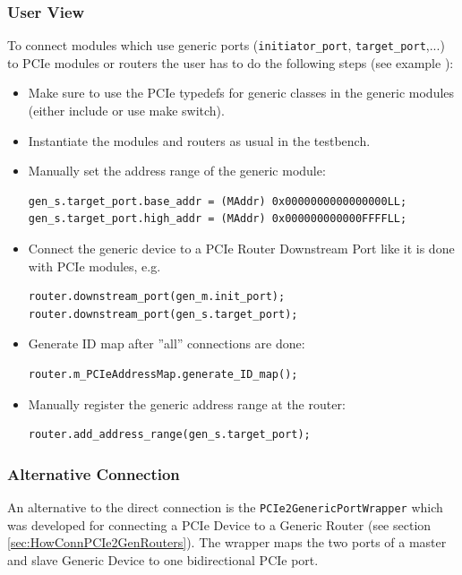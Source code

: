 \subsubsection{User View}
To connect modules which use generic ports (\lstinline|initiator_port|, \lstinline|target_port|,...) to PCIe modules or routers the user has to do the following steps (see example ):
\begin{itemize}
  \item Make sure to use the PCIe typedefs for generic classes in the generic modules (either include  or use make switch).
  \item Instantiate the modules and routers as usual in the testbench.
  \item Manually set the address range of the generic module:
    \begin{lstlisting}
gen_s.target_port.base_addr = (MAddr) 0x0000000000000000LL;
gen_s.target_port.high_addr = (MAddr) 0x000000000000FFFFLL;
    \end{lstlisting}
  \item Connect the generic device to a PCIe Router Downstream Port like it is done with PCIe modules, e.g. 
    \begin{lstlisting}
router.downstream_port(gen_m.init_port);
router.downstream_port(gen_s.target_port);
    \end{lstlisting}
  \item Generate ID map after ''all'' connections are done:
    \begin{lstlisting}
router.m_PCIeAddressMap.generate_ID_map();
    \end{lstlisting}
  \item Manually register the generic address range at the router:
    \begin{lstlisting}
router.add_address_range(gen_s.target_port);
    \end{lstlisting}
\end{itemize}

\subsubsection{Alternative Connection}
An alternative to the direct connection is the \lstinline|PCIe2GenericPortWrapper| which was developed for connecting a PCIe Device to a Generic Router (see section \ref{sec:HowConnPCIe2GenRouters}). The wrapper maps the two ports of a master and slave Generic Device to one bidirectional PCIe port. 

